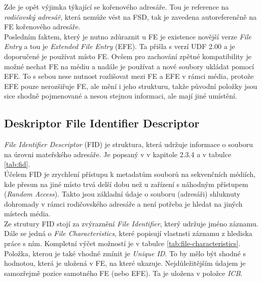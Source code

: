 Zde je opět výjimka týkající se kořenového adresáře. Tou je reference na \textit{rodičovský adresář}, která nemůže vést na FSD, tak je zavedena autoreferenčně na FE kořenového adresáře.\\
Posledním faktem, který je nutno zdůraznit u FE je existence novější verze \textit{File Entry} a tou je \textit{Extended File Entry} (EFE). Ta přišla s verzí UDF 2.00 a je doporučené je používat místo FE. Ovšem pro zachování zpětné kompatibility je možné nechat FE na médiu a nadále je používat a nové soubory ukládat pomocí EFE. To s sebou nese nutnost rozlišovat mezi FE a EFE v rámci média, protože EFE pouze nerozšiřuje FE, ale mění i jeho strukturu, takže původní položky jsou sice shodně pojmenované a nesou stejnou informaci, ale mají jiné umístění. 

\subsection{Deskriptor File Identifier Descriptor}
\label{subsec:fid}
\textit{File Identifier Descriptor} (FID) je struktura, která udržuje informace o souboru na úrovni mateřského adresáře. Je popsaný v \cite{osta-udf-0201} v kapitole 2.3.4 a v tabulce \ref{tab:fid}.\\
Účelem FID je zrychlení přístupu k metadatům souborů na sekvenčních médiích, kde přesun na jiné místo trvá delší dobu než u zařízení s náhodným přístupem (\textit{Random Access}). Takto jsou základní údaje o souboru (adresáři) shluknuty dohromady v rámci rodičovského adresáře a není potřeba je hledat na jiných místech média.\\
Ze strutury FID stojí za zvýraznění \textit{File Identifier}, který udržuje jméno záznamu. Dále se jedná o \textit{File Characteristics}, které popisují vlastnsti záznamu z hlediska práce s ním. Kompletní výčet možností je v tabulce \ref{tab:file-characteristics}. Položka, kterou je také vhodné zmínit je \textit{Unique ID}. To by mělo být shodné s hodnotou, která je uložená v FE, na které ukazuje. Nejdůležitějším údajem je samozřejmě pozice samotného FE (nebo EFE). Ta je uložena v položce \textit{ICB}. 
